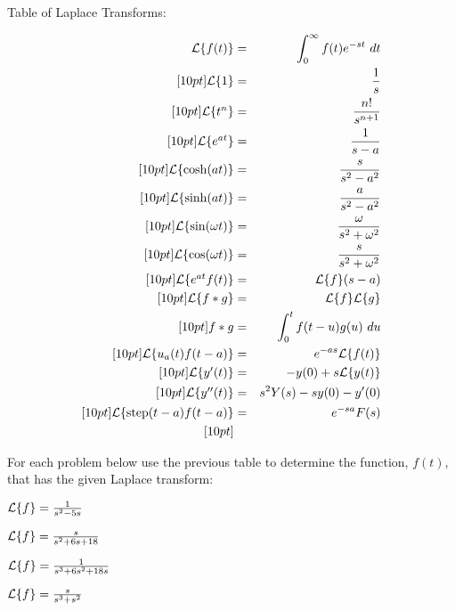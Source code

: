 \begin{problem}
Table of Laplace Transforms:

\begin{eqnarray}
  \laplace{f(t)}  & = & \int^\infty_0 f(t) e^{-st} ~ dt \\ [10pt]
  \laplace{1}      & = & \frac{1}{s} \\ [10pt]
  \laplace{t^n}    & = & \frac{n!}{s^{n+1}} \\ [10pt]
  \laplace{e^{at}} & = & \frac{1}{s-a} \\ [10pt]
  \laplace{\cosh(at)} & = & \frac{s}{s^2-a^2} \\ [10pt]
  \laplace{\sinh(at)} & = & \frac{a}{s^2-a^2} \\ [10pt]
  \laplace{\sin(\omega t)} & = & \frac{\omega}{s^2+\omega^2} \\ [10pt]
  \laplace{\cos(\omega t)} & = & \frac{s}{s^2+\omega^2} \\ [10pt]
  \laplace{e^{at}f(t)} & = & \laplace{f}(s-a) \\ [10pt]
  \laplace{f*g} & = & \laplace{f}\laplace{g} \\ [10pt]
  f*g & = & \int^t_0 f(t-u) g(u) ~ du \\ [10pt]
  \laplace{u_a(t) f(t-a)} & = & e^{-as} \laplace{f(t)} \\ [10pt]
  \laplace{y'(t)} & = & -y(0) + s \laplace{y(t)} \\ [10pt]
  \laplace{y''(t)}& = & s^2 Y(s) - sy(0) - y'(0) \\ [10pt]
  \laplace{\mathrm{step}(t-a)f(t-a)} & = & e^{-sa}F(s) \\ [10pt]
\end{eqnarray}



\item For each problem below use the previous table to determine the
  function, $f(t)$, that has the given Laplace transform:

  \begin{subproblem}
    \item $\laplace{f}  =  \frac{1}{s^2-5s}$
      \vfill

    \item $\laplace{f}  =  \frac{s}{s^2+6s+18}$
      \vfill


      \clearpage

    \item $\laplace{f}  =  \frac{1}{s^3+6s^2+18s}$
      \vfill


    \item $\laplace{f}  =  \frac{s}{s^3+s^2}$
      \vfill

  \end{subproblem}


\end{problem}

